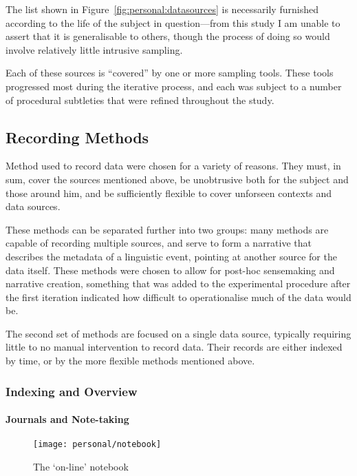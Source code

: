 The list shown in Figure~\ref{fig:personal:datasources} is necessarily furnished according to the life of the subject in question---from this study I am unable to assert that it is generalisable to others, though the process of doing so would involve relatively little intrusive sampling.

Each of these sources is ``covered'' by one or more sampling tools.  These tools progressed most during the iterative process, and each was subject to a number of procedural subtleties that were refined throughout the study.










\subsection{Recording Methods}
Method used to record data were chosen for a variety of reasons.  They must, in sum, cover the sources mentioned above, be unobtrusive both for the subject and those around him, and be sufficiently flexible to cover unforseen contexts and data sources.

These methods can be separated further into two groups: many methods are capable of recording multiple sources, and serve to form a narrative that describes the metadata of a linguistic event, pointing at another source for the data itself.  These methods were chosen to allow for post-hoc sensemaking and narrative creation, something that was added to the experimental procedure after the first iteration indicated how difficult to operationalise much of the data would be.

The second set of methods are focused on a single data source, typically requiring little to no manual intervention to record data.  Their records are either indexed by time, or by the more flexible methods mentioned above.


\subsubsection{Indexing and Overview}
\paragraph{Journals and Note-taking}

\begin{figure}[p]
    \centering
    \texttt{[image: personal/notebook]}
    \caption{The `on-line' notebook}
    \label{fig:personal:online_notebook}
\end{figure}


